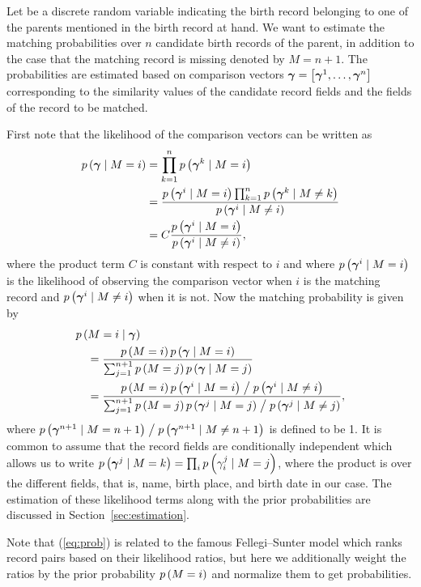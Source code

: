 \documentclass[sigconf]{acmart}
\begin{document}
Let \M be a discrete random variable indicating the birth record belonging to 
one of the parents mentioned in the birth record at hand. We want to estimate 
the matching probabilities over $n$ candidate birth records of the parent, in 
addition to the case that the matching record is missing denoted by $M=n+1$. 
The probabilities are estimated based on comparison vectors $\boldsymbol{\gamma} = 
\left[\boldsymbol{\gamma}^{1}, \dots, \boldsymbol{\gamma}^{n}\right]$ corresponding to the similarity values 
of the candidate record fields and the fields of the record to be matched.

First note that the likelihood of the comparison vectors can be written as
\begin{align}
 p\left(\boldsymbol{\gamma} \mid M=i\right) &= \prod_{k=1}^{n} p\left(\boldsymbol{\gamma}^{k} \mid M=i\right) \nonumber \\
 &= \frac{p\left(\boldsymbol{\gamma}^{i} \mid M=i\right) \prod_{k=1}^{n} p\left(\boldsymbol{\gamma}^{k} \mid M\neq 
 k\right)}{p\left(\boldsymbol{\gamma}^{i} \mid M\neq i\right)} \nonumber \\
 &= C \frac{p\left(\boldsymbol{\gamma}^{i} \mid M=i\right)}{p\left(\boldsymbol{\gamma}^{i} \mid M\neq i\right)}, \nonumber
\end{align}
where the product term $C$ is constant with respect to $i$ and where 
$p\left(\boldsymbol{\gamma}^{i} \mid M=i\right)$ is the likelihood of observing the comparison 
vector  when $i$ is the matching record and $p\left(\boldsymbol{\gamma}^{i} \mid M\neq i\right)$ 
when it is not.
Now the matching probability is given by
\begin{align}
 & p\left(M = i \mid \boldsymbol{\gamma}\right) \nonumber \\
 &\quad = \frac{p\left(M=i\right)p\left(\boldsymbol{\gamma} \mid M=i\right) }{ \sum_{j=1}^{n+1} 
 p\left(M=j\right) p\left(\boldsymbol{\gamma} \mid M=j\right)} \nonumber \\
 &\quad = \frac{p\left(M=i\right)p\left(\boldsymbol{\gamma}^{i} \mid M=i\right) \bigm/ p\left(\boldsymbol{\gamma}^{i} \mid 
 M\neq i\right)}{\sum_{j=1}^{n+1} p\left(M=j\right) p\left(\boldsymbol{\gamma}^{j} \mid M=j\right) \bigm/ p\left(\boldsymbol{\gamma}^{j} 
 \mid M\neq j\right)}, \label{eq:prob}
\end{align}
where $p\left(\boldsymbol{\gamma}^{n+1} \mid M=n+1\right) \bigm/ p\left(\boldsymbol{\gamma}^{n+1} \mid M\neq n+1\right)$ is 
defined to be 1.
It is common to assume that the record fields are conditionally independent 
\cite{christen2012} which allows us to write $p\left(\boldsymbol{\gamma}^{j} \mid M=k\right) = 
\prod_i p\left(\gamma^{j}_{i} \mid M=j\right)$, where the product is over the different 
fields, that is, name, birth place, and birth date in our case. The estimation 
of these likelihood terms along with the prior probabilities are discussed in 
Section~\ref{sec:estimation}.

Note that (\ref{eq:prob}) is related to the famous Fellegi--Sunter 
model \cite{fellegi1969} which ranks record pairs based on their likelihood 
ratios, but here we additionally weight the ratios by the prior probability 
$p\left(M=i\right)$ and normalize them to get probabilities. 
\end{document}
